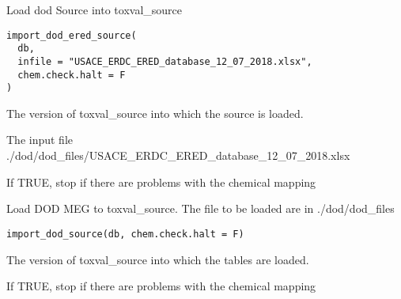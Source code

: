 \documentclass[letterpaper]{book}
\begin{document}
%
\begin{Description}\relax
Load dod Source into toxval\_source
\end{Description}
%
\begin{Usage}
\begin{verbatim}
import_dod_ered_source(
  db,
  infile = "USACE_ERDC_ERED_database_12_07_2018.xlsx",
  chem.check.halt = F
)
\end{verbatim}
\end{Usage}
%
\begin{Arguments}
\begin{ldescription}
\item[\code{db}] The version of toxval\_source into which the source is loaded.

\item[\code{infile}] The input file ./dod/dod\_files/USACE\_ERDC\_ERED\_database\_12\_07\_2018.xlsx

\item[\code{chem.check.halt}] If TRUE, stop if there are problems with the chemical mapping
\end{ldescription}
\end{Arguments}
%
\begin{Description}\relax
Load DOD MEG to toxval\_source. The file to be loaded are in ./dod/dod\_files
\end{Description}
%
\begin{Usage}
\begin{verbatim}
import_dod_source(db, chem.check.halt = F)
\end{verbatim}
\end{Usage}
%
\begin{Arguments}
\begin{ldescription}
\item[\code{db}] The version of toxval\_source into which the tables are loaded.

\item[\code{chem.check.halt}] If TRUE, stop if there are problems with the chemical mapping
\end{ldescription}
\end{Arguments}
\end{document}
